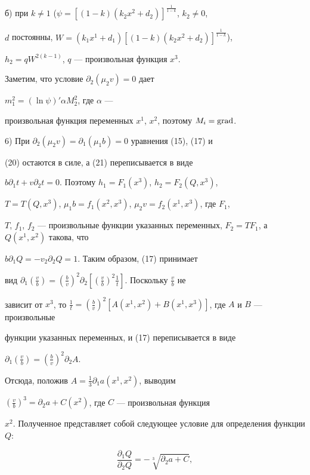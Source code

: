 б) при $k\ne1$ ($\psi=[(1-k)(k_2x^2+d_2)]^{\frac{1}{1-k}}$, $k_2\ne0$, 


$d$ постоянны, $W=(k_1x^1+d_1)[(1-k)(k_2x^2+d_2)]^{\frac{1}{1-k}}$), 


$h_2=q W^{2(k-1)}$, $q$ --- произвольная функция $x^3$. 


 


Заметим, что условие $\partial_2(\mu_2v)=0$ дает 


$m^2_1=(\ln\psi)'\alpha M^2_2$, где $\alpha$ --- 


произвольная функция переменных $x^1$, $x^2$, поэтому $M_i=\operatorname{grad}$. 


 


6) При $\partial_2(\mu_2v)=\partial_1(\mu_1b)=0$ уравнения (15), (17) и 


(20) остаются в силе, а (21) переписывается в виде 


$b\partial_1t+v\partial_2t=0$. Поэтому $h_1=F_1(x^3)$, $h_2=F_2(Q,x^3)$, 


$T=T(Q,x^3)$, $\mu_1b=f_1(x^2,x^3)$, $\mu_2v=f_2(x^1,x^3)$, где $F_1$, 


$T$, $f_1$, $f_2$ --- произвольные функции указанных переменных, $F_2=T 


F_1$, а $Q(x^1,x^2)$ такова, что 


$b\partial_1Q=-v_2\partial_2Q=1$. Таким образом, (17) принимает 


вид $\partial_1(\frac{v}{b})= (\frac{b}{v})^2 


\partial_2[(\frac{v}{b})^2\frac{1}{t}]$. Поскольку $\frac{v}{b}$ не 


зависит от $x^3$, то $\frac{1}{t}= 


(\frac{b}{v})^2[A(x^1,x^2)+B(x^1,x^3)]$, где $A$ и $B$ --- произвольные 


функции указанных переменных, и (17) переписывается в виде 


$\partial_1(\frac{v}{b})=(\frac{b}{v})^2\partial_2A$. 


 


Отсюда, положив $A=\frac{1}{3}\partial_1 a(x^1,x^2)$, выводим 


$(\frac{v}{b})^3=\partial_2a+C(x^2)$, где $C$ --- произвольная функция 


$x^2$. Полученное представляет собой следующее условие для определения функции $Q$: 


\begin{equation} 


\frac{\partial_1Q}{\partial_2Q}=-\sqrt[3]{\partial_2a+C},


\end{equation} 


